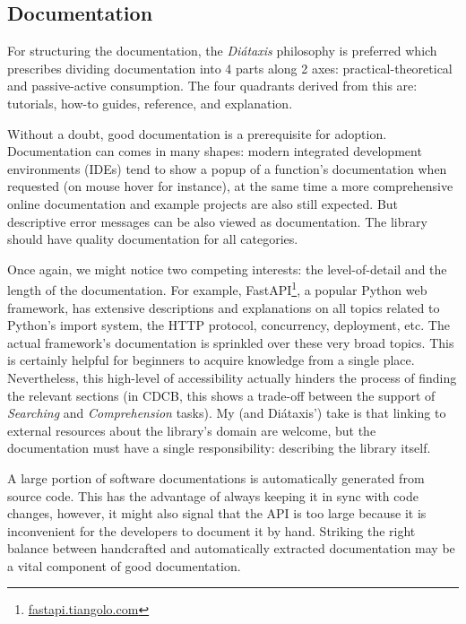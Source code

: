\subsection{Documentation}

For structuring the documentation, the \textit{Diátaxis} philosophy is preferred \cite{Procida_Diataxis_documentation_framework} which prescribes dividing documentation into 4 parts along 2 axes: practical-theoretical and passive-active consumption. The four quadrants derived from this are: tutorials, how-to guides, reference, and explanation.

Without a doubt, good documentation is a prerequisite for adoption. Documentation can comes in many shapes: modern integrated development environments (IDEs) tend to show a popup of a function's documentation when requested (on mouse hover for instance), at the same time a more comprehensive online documentation and example projects are also still expected. But descriptive error messages can be also viewed as documentation. The library should have quality documentation for all categories.

Once again, we might notice two competing interests: the level-of-detail and the length of the documentation. For example, FastAPI\footnote{\href{https://fastapi.tiangolo.com/async/\#concurrent-burgers}{fastapi.tiangolo.com}}, a popular Python web framework, has extensive descriptions and explanations on all topics related to Python's import system, the HTTP protocol, concurrency, deployment, etc. The actual framework's documentation is sprinkled over these very broad topics. This is certainly helpful for beginners to acquire knowledge from a single place. Nevertheless, this high-level of accessibility actually hinders the process of finding the relevant sections (in CDCB, this shows a trade-off between the support of \textit{Searching} and \textit{Comprehension} tasks). My (and Diátaxis') take is that linking to external resources about the library's domain are welcome, but the documentation must have a single responsibility: describing the library itself.

A large portion of software documentations is automatically generated from source code. This has the advantage of always keeping it in sync with code changes, however, it might also signal that the API is too large because it is inconvenient for the developers to document it by hand. Striking the right balance between handcrafted and automatically extracted documentation may be a vital component of good documentation.

